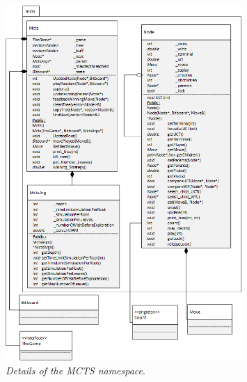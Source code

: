 \begin{figure}[!h] 
\centerline{\includegraphics[width=0.8\textwidth]{Annexes/MCTS.png}}
\caption{\label{fig:array}\textit{Details of the MCTS namespace}.}
\end{figure}
